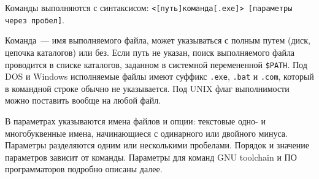 Команды выполняются с синтаксисом: 
\verb|<[путь]команда[.exe]> [параметры через пробел]|.

Команда\ --- имя выполняемого файла, может указываться с полным путем (диск,
цепочка каталогов) или без. Если путь не указан, поиск выполняемого файла
проводится в списке каталогов, заданном в системной перемененной \verb|$PATH|.
Под DOS и Windows исполняемые файлы имеют суффикс \verb|.exe|, \verb|.bat| и
\verb|.com|, который в командной строке обычно не указывается. Под UNIX флаг
выполнимости можно поставить вообще на любой файл.

В параметрах указываются имена файлов и опции: текстовые одно- и многобуквенные
имена, начинающиеся с одинарного или двойного минуса. Параметры разделяются
одним или несколькими пробелами. Порядок и значение параметров зависит от
команды. Параметры для команд GNU toolchain и ПО программаторов подробно описаны
далее.

